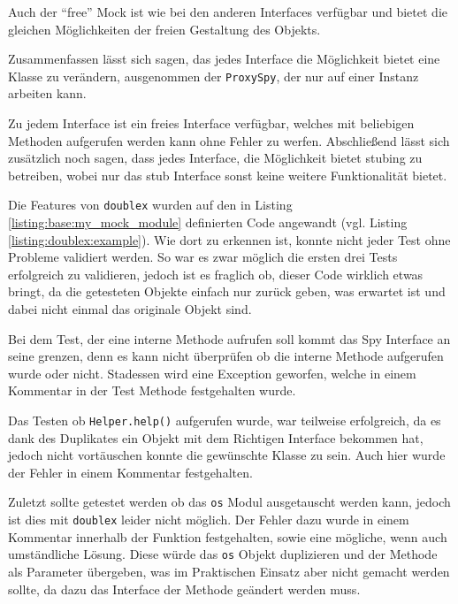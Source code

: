 Auch der "`free"' Mock ist wie bei den anderen Interfaces verfügbar und bietet
die gleichen Möglichkeiten der freien Gestaltung des Objekts.
\newline

Zusammenfassen lässt sich sagen, das jedes Interface die Möglichkeit bietet eine
Klasse zu verändern, ausgenommen der \lstinline{ProxySpy}, der nur auf einer
Instanz arbeiten kann.

Zu jedem Interface ist ein freies Interface verfügbar, welches mit beliebigen
Methoden aufgerufen werden kann ohne Fehler zu werfen. Abschließend lässt sich
zusätzlich noch sagen, dass jedes Interface, die Möglichkeit bietet
\gls{stub}ing zu betreiben, wobei nur das \Gls{stub} Interface sonst keine
weitere Funktionalität bietet.
\newline

Die Features von \lstinline{doublex} wurden auf den in Listing
\ref{listing:base:my_mock_module} definierten Code angewandt (vgl. Listing
\ref{listing:doublex:example}). Wie dort zu erkennen ist, konnte nicht jeder
Test ohne Probleme validiert werden. So war es zwar möglich die ersten drei
Tests erfolgreich zu validieren, jedoch ist es fraglich ob, dieser Code
wirklich etwas bringt, da die getesteten Objekte einfach nur zurück geben, was
erwartet ist und dabei nicht einmal das originale Objekt sind.

Bei dem Test, der eine interne Methode aufrufen soll kommt das Spy Interface an
seine grenzen, denn es kann nicht überprüfen ob die interne Methode aufgerufen
wurde oder nicht. Stadessen wird eine Exception geworfen, welche in einem
Kommentar in der Test Methode festgehalten wurde.

Das Testen ob \lstinline{Helper.help()} aufgerufen wurde, war teilweise
erfolgreich, da es dank des Duplikates ein Objekt mit dem Richtigen Interface
bekommen hat, jedoch nicht vortäuschen konnte die gewünschte Klasse zu sein.
Auch hier wurde der Fehler in einem Kommentar festgehalten.

Zuletzt sollte getestet werden ob das \lstinline{os} Modul ausgetauscht werden
kann, jedoch ist dies mit \lstinline{doublex} leider nicht möglich. Der Fehler
dazu wurde in einem Kommentar innerhalb der Funktion festgehalten, sowie eine
mögliche, wenn auch umständliche Lösung.
Diese würde das \lstinline{os} Objekt duplizieren und der Methode als
Parameter übergeben, was im Praktischen Einsatz aber nicht gemacht werden
sollte, da dazu das Interface der Methode geändert werden muss.
\newline

